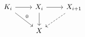 \documentclass[12pt]{standalone}
\begin{document}
        $$

\begin{tikzcd}
K_i \ar[rd,"0"] \ar[r] & X_i \ar[r] \ar[d] & X_{i+1} \ar[ld,dashed] \\
& X & 
\end{tikzcd}
        $$
        
\end{document}
